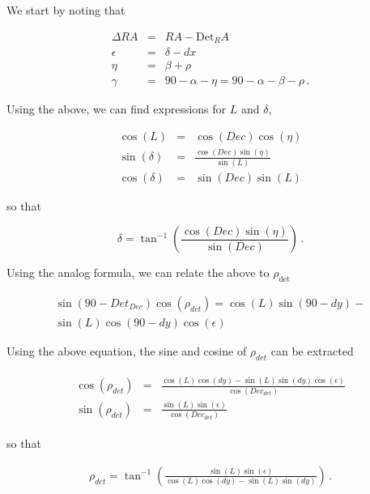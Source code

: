\documentclass[a4paper,fleqn]{cas-dc}\sloppy
\begin{document}
We start by noting that

\begin{eqnarray}
\Delta RA &=& RA - \mathrm{Det}_RA \\
\epsilon &=& \delta - dx \\
\eta &=& \beta + \rho \\
\gamma &=& 90 - \alpha - \eta = 90 - \alpha - \beta - \rho \, .
\end{eqnarray}

Using the above, we can find expressions for $L$ and $\delta$, 

\begin{eqnarray}
\cos(L) &=& \cos(Dec) \cos(\eta) \\
\sin(\delta) &=& \frac{\cos(Dec) \sin(\eta)}{ \sin(L) } \\
\cos(\delta) &=& \sin(Dec) \sin(L) 
\end{eqnarray}

\noindent
so that

\begin{equation}
\delta = \tan^{-1}\left( \frac{\cos(Dec) \sin(\eta)}{ \sin(Dec) } \right) \, .
\end{equation}

Using the analog formula, we can relate the above to $\rho_\mathrm{det}$

\begin{equation}
\begin{aligned}
\sin(90 - Det_{Dec} ) \cos(\rho_{det}) = \cos(L) \sin(90 - dy) - \\
\sin(L) \cos(90-dy) \cos(\epsilon)
\end{aligned}
\end{equation}

\noindent
Using the above equation, the sine and cosine of $\rho_{det}$ can be extracted

\begin{eqnarray}
\begin{aligned}
\cos(\rho_{det}) &=& \frac{ \cos(L)\cos(dy) - \sin(L)\sin(dy)\cos(\epsilon) }{ \cos(Dec_{det})  } \\
\sin(\rho_{det}) &=& \frac{ \sin(L)\sin(\epsilon)}{ \cos(Dec_{det}) }  
\end{aligned}
\end{eqnarray}

\noindent
so that

\begin{equation}
\begin{aligned}
\rho_{det} = \tan^{-1}\left( \frac{\sin(L) \sin(\epsilon) }{\cos(L)\cos(dy) - \sin(L) \sin(dy) } \right) \, . 
\end{aligned}
\end{equation}
\end{document}
